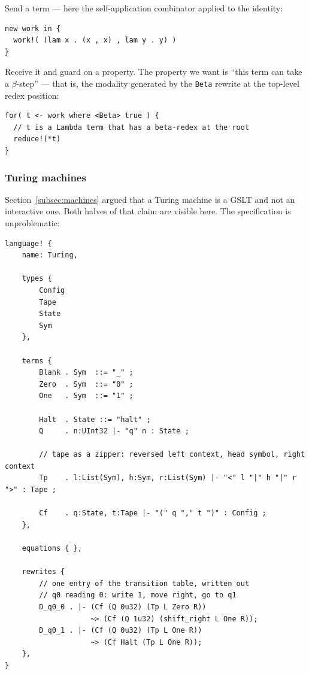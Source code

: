 \documentclass[11pt]{article}
\theoremstyle{definition}
\theoremstyle{plain}
\theoremstyle{remark}
\begin{document}
Send a term --- here the self-application combinator applied to the identity:

\begin{lstlisting}
new work in {
  work!( (lam x . (x , x) , lam y . y) )
}
\end{lstlisting}

Receive it and guard on a property. The property we want is ``this term can take a
$\beta$-step'' --- that is, the modality generated by the \texttt{Beta} rewrite at the
top-level redex position:

\begin{lstlisting}
for( t <- work where <Beta> true ) {
  // t is a Lambda term that has a beta-redex at the root
  reduce!(*t)
}
\end{lstlisting}

\subsubsection{Turing machines}
\label{subsec:rubric-turing}

Section~\ref{subsec:machines} argued that a Turing machine is a GSLT and not an interactive
one. Both halves of that claim are visible here. The specification is unproblematic:

\begin{lstlisting}
language! {
    name: Turing,

    types {
        Config
        Tape
        State
        Sym
    },

    terms {
        Blank . Sym  ::= "_" ;
        Zero  . Sym  ::= "0" ;
        One   . Sym  ::= "1" ;

        Halt  . State ::= "halt" ;
        Q     . n:UInt32 |- "q" n : State ;

        // tape as a zipper: reversed left context, head symbol, right context
        Tp    . l:List(Sym), h:Sym, r:List(Sym) |- "<" l "|" h "|" r ">" : Tape ;

        Cf    . q:State, t:Tape |- "(" q "," t ")" : Config ;
    },

    equations { },

    rewrites {
        // one entry of the transition table, written out
        // q0 reading 0: write 1, move right, go to q1
        D_q0_0 . |- (Cf (Q 0u32) (Tp L Zero R))
                    ~> (Cf (Q 1u32) (shift_right L One R));
        D_q0_1 . |- (Cf (Q 0u32) (Tp L One R))
                    ~> (Cf Halt (Tp L One R));
    },
}
\end{lstlisting}
\end{document}
